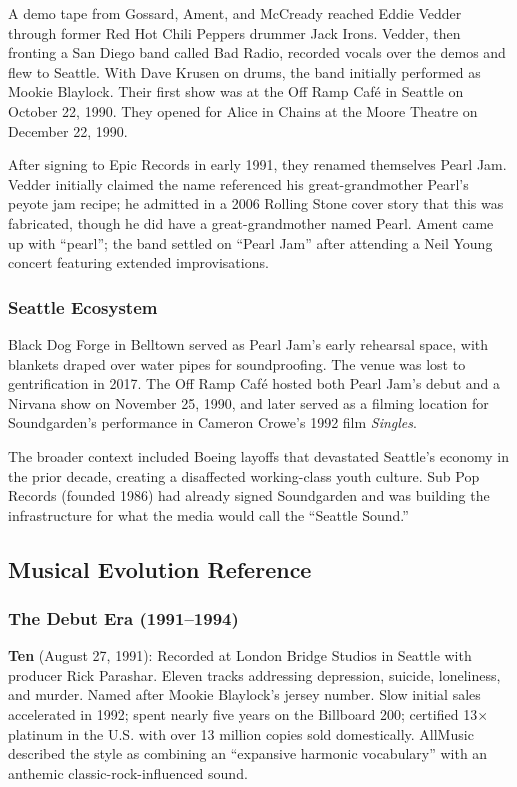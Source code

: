 \documentclass[11pt,letterpaper]{article}
\begin{document}
A demo tape from Gossard, Ament, and McCready reached Eddie Vedder through former Red Hot Chili Peppers drummer Jack Irons. Vedder, then fronting a San Diego band called Bad Radio, recorded vocals over the demos and flew to Seattle. With Dave Krusen on drums, the band initially performed as Mookie Blaylock. Their first show was at the Off Ramp Caf\'{e} in Seattle on October 22, 1990. They opened for Alice in Chains at the Moore Theatre on December 22, 1990.

After signing to Epic Records in early 1991, they renamed themselves Pearl Jam. Vedder initially claimed the name referenced his great-grandmother Pearl's peyote jam recipe; he admitted in a 2006 Rolling Stone cover story that this was fabricated, though he did have a great-grandmother named Pearl. Ament came up with ``pearl''; the band settled on ``Pearl Jam'' after attending a Neil Young concert featuring extended improvisations.

\subsubsection{Seattle Ecosystem}

Black Dog Forge in Belltown served as Pearl Jam's early rehearsal space, with blankets draped over water pipes for soundproofing. The venue was lost to gentrification in 2017. The Off Ramp Caf\'{e} hosted both Pearl Jam's debut and a Nirvana show on November 25, 1990, and later served as a filming location for Soundgarden's performance in Cameron Crowe's 1992 film \textit{Singles}.

The broader context included Boeing layoffs that devastated Seattle's economy in the prior decade, creating a disaffected working-class youth culture. Sub Pop Records (founded 1986) had already signed Soundgarden and was building the infrastructure for what the media would call the ``Seattle Sound.''

\subsection{Musical Evolution Reference}

\subsubsection{The Debut Era (1991--1994)}

\textbf{Ten} (August 27, 1991): Recorded at London Bridge Studios in Seattle with producer Rick Parashar. Eleven tracks addressing depression, suicide, loneliness, and murder. Named after Mookie Blaylock's jersey number. Slow initial sales accelerated in 1992; spent nearly five years on the Billboard 200; certified 13$\times$ platinum in the U.S. with over 13 million copies sold domestically. AllMusic described the style as combining an ``expansive harmonic vocabulary'' with an anthemic classic-rock-influenced sound.
\end{document}
